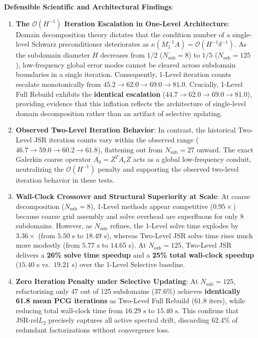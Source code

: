 \documentclass[preprint,12pt,3p]{elsarticle}
\begin{document}
\textbf{Defensible Scientific and Architectural Findings}:
\begin{enumerate}
    \item \textbf{The $\mathcal{O}(H^{-1})$ Iteration Escalation in One-Level Architecture}: Domain decomposition theory dictates that the condition number of a single-level Schwarz preconditioner deteriorates as $\kappa(M_1^{-1} A) = \mathcal{O}(H^{-1} \delta^{-1})$. As the subdomain diameter $H$ decreases from $1/2$ ($N_{\text{sub}}=8$) to $1/5$ ($N_{\text{sub}}=125$), low-frequency global error modes cannot be cleared across subdomain boundaries in a single iteration. Consequently, 1-Level iteration counts escalate monotonically from $45.2 \to 62.0 \to 69.0 \to 81.0$. Crucially, 1-Level Full Rebuild exhibits the \textbf{identical escalation} ($44.7 \to 62.0 \to 69.0 \to 81.0$), providing evidence that this inflation reflects the architecture of single-level domain decomposition rather than an artifact of selective updating.
    \item \textbf{Observed Two-Level Iteration Behavior}: In contrast, the historical Two-Level JSR iteration counts vary within the observed range ($46.7 \to 59.0 \to 60.2 \to 61.8$), flattening out from $N_{\text{sub}}=27$ onward. The exact Galerkin coarse operator $A_0 = Z^T A_t Z$ acts as a global low-frequency conduit, neutralizing the $\mathcal{O}(H^{-1})$ penalty and supporting the observed two-level iteration behavior in these tests.
    \item \textbf{Wall-Clock Crossover and Structural Superiority at Scale}: At coarse decomposition ($N_{\text{sub}}=8$), 1-Level methods appear competitive ($0.95\times$) because coarse grid assembly and solve overhead are superfluous for only 8 subdomains. However, as $N_{\text{sub}}$ refines, the 1-Level solve time explodes by $3.36\times$ (from $5.50\text{ s}$ to $18.49\text{ s}$), whereas Two-Level JSR solve time rises much more modestly (from $5.77\text{ s}$ to $14.65\text{ s}$). At $N_{\text{sub}}=125$, Two-Level JSR delivers a \textbf{26\% solve time speedup} and a \textbf{25\% total wall-clock speedup} ($15.40\text{ s}$ vs.\ $19.21\text{ s}$) over the 1-Level Selective baseline.
    \item \textbf{Zero Iteration Penalty under Selective Updating}: At $N_{\text{sub}}=125$, refactorizing only 47 out of 125 subdomains ($37.6\%$) achieves \textbf{identically 61.8 mean PCG iterations} as Two-Level Full Rebuild ($61.8$ iters), while reducing total wall-clock time from $16.29\text{ s}$ to $15.40\text{ s}$. This confirms that JSR-$\text{rel}L_2$ precisely captures all active spectral drift, discarding 62.4\% of redundant factorizations without convergence loss.
\end{enumerate}
\end{document}
